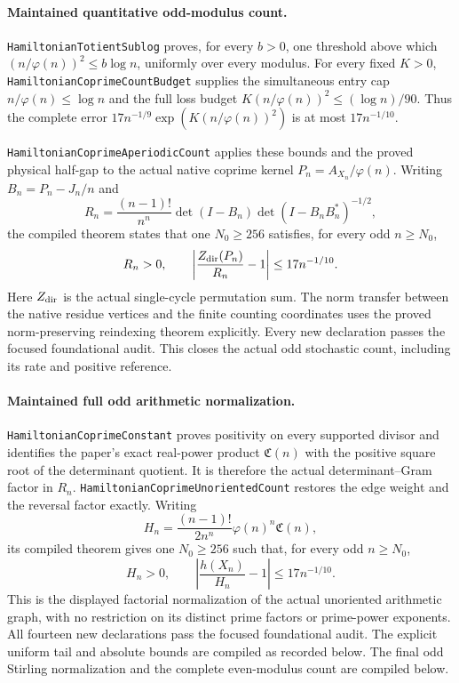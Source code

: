 \paragraph{Maintained quantitative odd-modulus count.}
\texttt{HamiltonianTotientSublog} proves, for every \(b>0\),
one threshold above which
\((n/\varphi(n))^2\leq b\log n\), uniformly over every modulus.
For every fixed \(K>0\), \texttt{HamiltonianCoprimeCountBudget}
supplies the simultaneous entry cap \(n/\varphi(n)\leq\log n\)
and the full loss budget
\(K(n/\varphi(n))^2\leq(\log n)/90\).
Thus the complete error
\(17n^{-1/9}\exp(K(n/\varphi(n))^2)\)
is at most \(17n^{-1/10}\).

\texttt{HamiltonianCoprimeAperiodicCount} applies these bounds
and the proved physical half-gap to the actual native
coprime kernel \(P_n=A_{X_n}/\varphi(n)\).
Writing \(B_n=P_n-J_n/n\) and
\[
 R_n=\frac{(n-1)!}{n^n}\det(I-B_n)
                      \det(I-B_nB_n^*)^{-1/2},
\]
the compiled theorem states that one \(N_0\geq256\) satisfies,
for every odd \(n\geq N_0\),
\[
 R_n>0,\qquad
 \left|\frac{Z_{\rm dir}(P_n)}{R_n}-1\right|
                      \leq17n^{-1/10}.
\]
Here \(Z_{\rm dir}\) is the actual single-cycle permutation sum.
The norm transfer between the native residue vertices and
the finite counting coordinates uses the proved norm-preserving
reindexing theorem explicitly.
Every new declaration passes the focused foundational audit.
This closes the actual odd stochastic count, including its
rate and positive reference.

\paragraph{Maintained full odd arithmetic normalization.}
\texttt{HamiltonianCoprimeConstant} proves positivity on
every supported divisor and identifies the paper's exact
real-power product \(\mathfrak C(n)\) with the positive
square root of the determinant quotient. It is therefore
the actual determinant--Gram factor in \(R_n\).
\texttt{HamiltonianCoprimeUnorientedCount} restores the
edge weight and the reversal factor exactly.
Writing
\[
 H_n=\frac{(n-1)!}{2n^n}\varphi(n)^n\mathfrak C(n),
\]
its compiled theorem gives one \(N_0\geq256\) such that,
for every odd \(n\geq N_0\),
\[
 H_n>0,\qquad
 \left|\frac{h(X_n)}{H_n}-1\right|\leq17n^{-1/10}.
\]
This is the displayed factorial normalization of the actual
unoriented arithmetic graph, with no restriction on its
distinct prime factors or prime-power exponents.
All fourteen new declarations pass the focused foundational
audit. The explicit uniform tail and absolute bounds are
compiled as recorded below. The final odd Stirling normalization
and the complete even-modulus count are compiled below.

